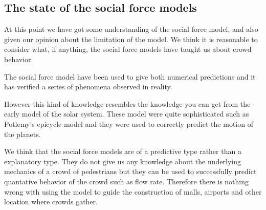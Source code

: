 \subsection{The state of the social force models}
At this point we have got some understanding of the social force model, and 
also given our opinion about the limitation of the model. We think it is 
reasonable to consider what, if anything, the social force models have taught 
us about crowd behavior. 

The social force model have been used to give both numerical predictions 
and it has verified a series of phenomena observed in reality.

However this kind of knowledge resembles the knowledge you can get from 
the early model of the solar system. These model were quite sophisticated 
such as Potlemy's epicycle model and they were used to correctly predict the 
motion of the planets.

We think that the social force models are of a predictive type rather than 
a explanatory type. They do not give us any knowledge about the underlying 
mechanics of a crowd of pedestrians but they can be used to successfully 
predict quantative behavior of the crowd such as  flow rate. Therefore there 
is nothing wrong with using the model to guide the construction of malls, airports 
and other location where crowds gather.